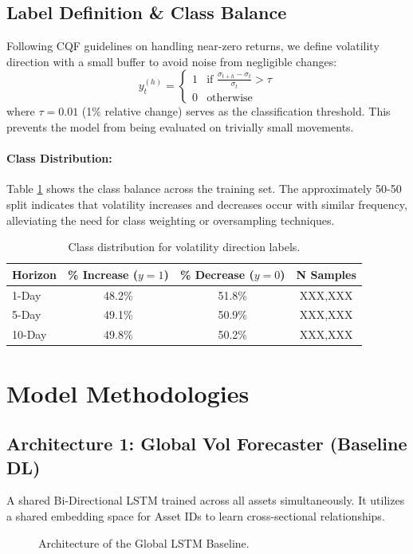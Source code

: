 \documentclass[11pt, a4paper]{article}
\begin{document}
\subsection{Label Definition \& Class Balance}
Following CQF guidelines on handling near-zero returns, we define volatility 
direction with a small buffer to avoid noise from negligible changes:
\begin{equation}
    y_t^{(h)} = 
    \begin{cases}
        1 & \text{if } \frac{\sigma_{t+h} - \sigma_t}{\sigma_t} > \tau \\
        0 & \text{otherwise}
    \end{cases}
\end{equation}
where $\tau = 0.01$ (1\% relative change) serves as the classification threshold. 
This prevents the model from being evaluated on trivially small movements.
\paragraph{Class Distribution:}
Table \ref{tab:class_balance} shows the class balance across the training set. 
The approximately 50-50 split indicates that volatility increases and decreases 
occur with similar frequency, alleviating the need for class weighting or 
oversampling techniques.
\begin{table}[h]
\centering
\begin{tabular}{lccc}
\toprule
Horizon & \% Increase ($y=1$) & \% Decrease ($y=0$) & N Samples \\
\midrule
1-Day   & 48.2\% & 51.8\% & XXX,XXX \\
5-Day   & 49.1\% & 50.9\% & XXX,XXX \\
10-Day  & 49.8\% & 50.2\% & XXX,XXX \\
\bottomrule
\end{tabular}
\caption{Class distribution for volatility direction labels.}
\label{tab:class_balance}
\end{table}
\section{Model Methodologies}

\subsection{Architecture 1: Global Vol Forecaster (Baseline DL)}
A shared Bi-Directional LSTM trained across all assets simultaneously. It utilizes a shared embedding space for Asset IDs to learn cross-sectional relationships.
\begin{figure}[H]
    \centering
    \caption{Architecture of the Global LSTM Baseline.}
\end{figure}
\end{document}
